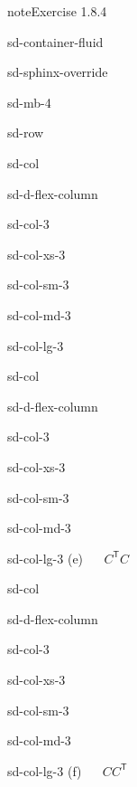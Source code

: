 \documentclass[letterpaper,10pt,english]{jupyterBook}
\begin{document}
\begin{sphinxadmonition}{note}{Exercise 1.8.4}
\begin{sphinxuseclass}{sd-container-fluid}
\begin{sphinxuseclass}{sd-sphinx-override}
\begin{sphinxuseclass}{sd-mb-4}
\begin{sphinxuseclass}{sd-row}
\begin{sphinxuseclass}{sd-col}
\begin{sphinxuseclass}{sd-d-flex-column}
\begin{sphinxuseclass}{sd-col-3}
\begin{sphinxuseclass}{sd-col-xs-3}
\begin{sphinxuseclass}{sd-col-sm-3}
\begin{sphinxuseclass}{sd-col-md-3}
\begin{sphinxuseclass}{sd-col-lg-3}
\end{sphinxuseclass}
\end{sphinxuseclass}
\end{sphinxuseclass}
\end{sphinxuseclass}
\end{sphinxuseclass}
\end{sphinxuseclass}
\end{sphinxuseclass}
\begin{sphinxuseclass}{sd-col}
\begin{sphinxuseclass}{sd-d-flex-column}
\begin{sphinxuseclass}{sd-col-3}
\begin{sphinxuseclass}{sd-col-xs-3}
\begin{sphinxuseclass}{sd-col-sm-3}
\begin{sphinxuseclass}{sd-col-md-3}
\begin{sphinxuseclass}{sd-col-lg-3}
\sphinxAtStartPar
(e)    \(C^\mathsf{T}C\)

\end{sphinxuseclass}
\end{sphinxuseclass}
\end{sphinxuseclass}
\end{sphinxuseclass}
\end{sphinxuseclass}
\end{sphinxuseclass}
\end{sphinxuseclass}
\begin{sphinxuseclass}{sd-col}
\begin{sphinxuseclass}{sd-d-flex-column}
\begin{sphinxuseclass}{sd-col-3}
\begin{sphinxuseclass}{sd-col-xs-3}
\begin{sphinxuseclass}{sd-col-sm-3}
\begin{sphinxuseclass}{sd-col-md-3}
\begin{sphinxuseclass}{sd-col-lg-3}
\sphinxAtStartPar
(f)    \(CC^\mathsf{T}\)


\end{sphinxuseclass}
\end{sphinxuseclass}
\end{sphinxuseclass}
\end{sphinxuseclass}
\end{sphinxuseclass}
\end{sphinxuseclass}
\end{sphinxuseclass}
\end{sphinxuseclass}
\end{sphinxuseclass}
\end{sphinxuseclass}
\end{sphinxuseclass}
\end{sphinxadmonition}
\end{document}
